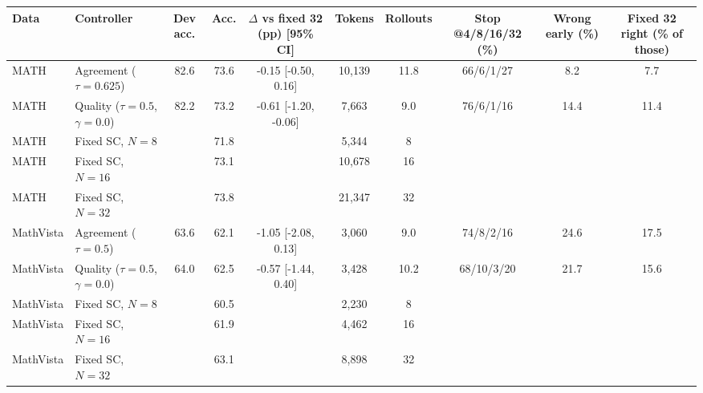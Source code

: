 \begin{tabular}{llcccccccc}
\toprule
Data & Controller & Dev acc. & Acc. & $\Delta$ vs fixed 32 (pp) [95\% CI] & Tokens & Rollouts & Stop @4/8/16/32 (\%) & Wrong early (\%) & Fixed 32 right (\% of those) \\
\midrule
MATH & Agreement ($\tau=0.625$) & 82.6 & 73.6 & -0.15 [-0.50, 0.16] & 10,139 & 11.8 & 66/6/1/27 & 8.2 & 7.7 \\
MATH & Quality ($\tau=0.5$, $\gamma=0.0$) & 82.2 & 73.2 & -0.61 [-1.20, -0.06] & 7,663 & 9.0 & 76/6/1/16 & 14.4 & 11.4 \\
MATH & Fixed SC, $N=8$ & & 71.8 & & 5,344 & 8 & & &  \\
MATH & Fixed SC, $N=16$ & & 73.1 & & 10,678 & 16 & & &  \\
MATH & Fixed SC, $N=32$ & & 73.8 & & 21,347 & 32 & & &  \\ \midrule
MathVista & Agreement ($\tau=0.5$) & 63.6 & 62.1 & -1.05 [-2.08, 0.13] & 3,060 & 9.0 & 74/8/2/16 & 24.6 & 17.5 \\
MathVista & Quality ($\tau=0.5$, $\gamma=0.0$) & 64.0 & 62.5 & -0.57 [-1.44, 0.40] & 3,428 & 10.2 & 68/10/3/20 & 21.7 & 15.6 \\
MathVista & Fixed SC, $N=8$ & & 60.5 & & 2,230 & 8 & & &  \\
MathVista & Fixed SC, $N=16$ & & 61.9 & & 4,462 & 16 & & &  \\
MathVista & Fixed SC, $N=32$ & & 63.1 & & 8,898 & 32 & & &  \\
\bottomrule
\end{tabular}